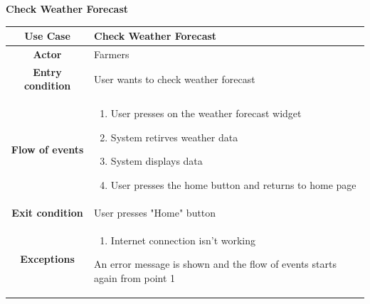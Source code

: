 \documentclass[table, 12pt]{article}
\begin{document}
\begin{itemize}
            \begin{table}[H]
                \item[] \textbf{Check Weather Forecast}
                \item[] 
                \centering
                \begin{tabular}{|c |m{}|}
                    \hline
                    \textbf{Use Case} & Check Weather Forecast\\ \hline
                    \textbf{Actor} & Farmers\\ \hline
                    \textbf{Entry condition} & User wants to check weather forecast\\  \hline
                    \textbf{Flow of events} & \begin{enumerate}
                                                \item User presses on the weather forecast widget
                                                \item System retirves weather data 
                                                \item System displays data
                                                \item User presses the home button and returns to home page
                                            \end{enumerate}\\ \hline
                    \textbf{Exit condition} & User presses "Home" button\\ \hline
                    \textbf{Exceptions} & \begin{enumerate}
                        \item Internet connection isn't working
                    \end{enumerate}
                    An error message is shown and the flow of events starts again from point 1\\ \hline                    
                \end{tabular}
            \end{table}


\end{itemize}
\end{document}

